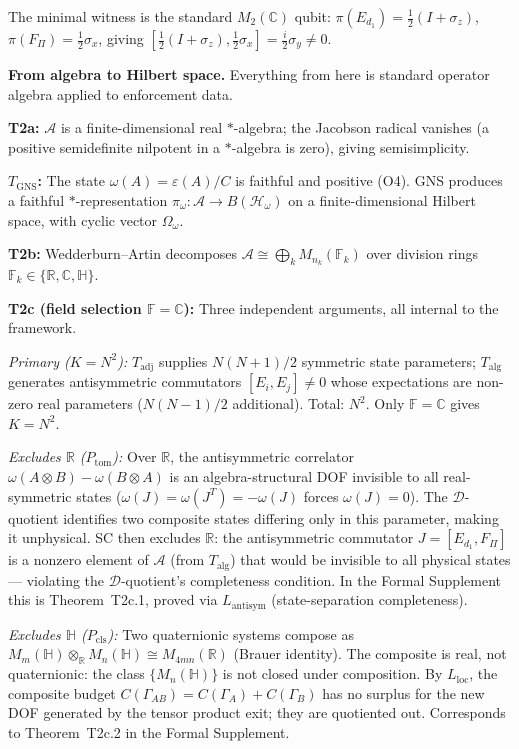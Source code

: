 \documentclass[11pt]{article}
\theoremstyle{remark}
\begin{document}
The minimal witness is the standard $M_2(\mathbb{C})$ qubit:
$\pi(E_{d_1}) = \tfrac{1}{2}(I+\sigma_z)$, $\pi(F_\Pi) = \tfrac{1}{2}\sigma_x$,
giving $[\tfrac{1}{2}(I+\sigma_z), \tfrac{1}{2}\sigma_x] = \tfrac{i}{2}\sigma_y \ne 0$.

\medskip

\noindent\textbf{From algebra to Hilbert space.}  Everything from here is
standard operator algebra applied to enforcement data.

\textbf{T2a:} $\mathcal{A}$ is a finite-dimensional real $*$-algebra;
the Jacobson radical vanishes (a positive semidefinite nilpotent in a
$*$-algebra is zero), giving semisimplicity.

\textbf{$T_{\mathrm{GNS}}$:} The state $\omega(A) = \varepsilon(A)/C$ is
faithful and positive (O4).  GNS produces a faithful $*$-representation
$\pi_\omega: \mathcal{A} \to B(\mathcal{H}_\omega)$ on a finite-dimensional
Hilbert space, with cyclic vector $\Omega_\omega$.

\textbf{T2b:} Wedderburn--Artin decomposes $\mathcal{A} \cong \bigoplus_k
M_{n_k}(\mathbb{F}_k)$ over division rings $\mathbb{F}_k \in \{\mathbb{R},
\mathbb{C}, \mathbb{H}\}$.

\textbf{T2c (field selection $\mathbb{F} = \mathbb{C}$):}  Three
independent arguments, all internal to the framework.

\emph{Primary ($K = N^2$):}  $T_{\mathrm{adj}}$ supplies $N(N+1)/2$
symmetric state parameters; $T_{\mathrm{alg}}$ generates antisymmetric
commutators $[E_i, E_j] \ne 0$ whose expectations are non-zero real
parameters ($N(N-1)/2$ additional).  Total: $N^2$.  Only $\mathbb{F} =
\mathbb{C}$ gives $K = N^2$.

\emph{Excludes $\mathbb{R}$ ($P_{\mathrm{tom}}$):}  Over $\mathbb{R}$, the
antisymmetric correlator $\omega(A \otimes B) - \omega(B \otimes A)$ is an
algebra-structural DOF invisible to all real-symmetric states ($\omega(J) =
\omega(J^T) = -\omega(J)$ forces $\omega(J) = 0$).  The $\mathcal{D}$-quotient
identifies two composite states differing only in this parameter, making it
unphysical.  SC then excludes $\mathbb{R}$: the antisymmetric commutator
$J = [E_{d_1}, F_\Pi]$ is a nonzero element of $\mathcal{A}$ (from
$T_{\mathrm{alg}}$) that would be invisible to all physical states ---
violating the $\mathcal{D}$-quotient's completeness condition.  In the Formal
Supplement this is Theorem~T2c.1, proved via $L_{\mathrm{antisym}}$
(state-separation completeness).

\emph{Excludes $\mathbb{H}$ ($P_{\mathrm{cls}}$):}  Two quaternionic
systems compose as $M_m(\mathbb{H}) \otimes_\mathbb{R} M_n(\mathbb{H}) \cong
M_{4mn}(\mathbb{R})$ (Brauer identity).  The composite is real, not
quaternionic: the class $\{M_n(\mathbb{H})\}$ is not closed under composition.
By $L_{\mathrm{loc}}$, the composite budget $C(\Gamma_{AB}) = C(\Gamma_A) +
C(\Gamma_B)$ has no surplus for the new DOF generated by the tensor product
exit; they are quotiented out.  Corresponds to Theorem~T2c.2 in the Formal
Supplement.
\end{document}
